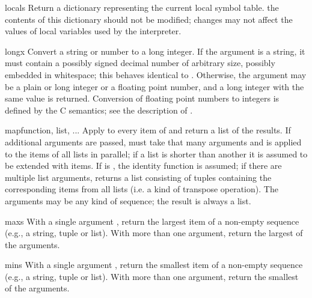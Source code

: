 \begin{funcdesc}{locals}{}
Return a dictionary representing the current local symbol table.
 the contents of this dictionary should not be
modified; changes may not affect the values of local variables used by 
the interpreter.
\end{funcdesc}

\begin{funcdesc}{long}{x}
  Convert a string or number to a long integer.  If the argument is a
  string, it must contain a possibly signed decimal number of
  arbitrary size, possibly embedded in whitespace;
  this behaves identical to .
  Otherwise, the argument may be a plain or
  long integer or a floating point number, and a long integer with
  the same value is returned.    Conversion of floating
  point numbers to integers is defined by the C semantics;
  see the description of .
\end{funcdesc}

\begin{funcdesc}{map}{function, list, ...}
Apply  to every item of  and return a list
of the results.  If additional  arguments are passed, 
 must take that many arguments and is applied to
the items of all lists in parallel; if a list is shorter than another
it is assumed to be extended with  items.  If
 is , the identity function is assumed; if
there are multiple list arguments,  returns a list
consisting of tuples containing the corresponding items from all lists
(i.e. a kind of transpose operation).  The  arguments may be
any kind of sequence; the result is always a list.
\end{funcdesc}

\begin{funcdesc}{max}{s}
With a single argument , return the largest item of a
non-empty sequence (e.g., a string, tuple or list).  With more than
one argument, return the largest of the arguments.
\end{funcdesc}

\begin{funcdesc}{min}{s}
With a single argument , return the smallest item of a
non-empty sequence (e.g., a string, tuple or list).  With more than
one argument, return the smallest of the arguments.
\end{funcdesc}

